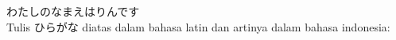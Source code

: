 \item
{\japantwo わたしのなまえはりんです} \\
Tulis {\japan ひらがな} diatas dalam bahasa latin dan artinya dalam bahasa indonesia:
\\

